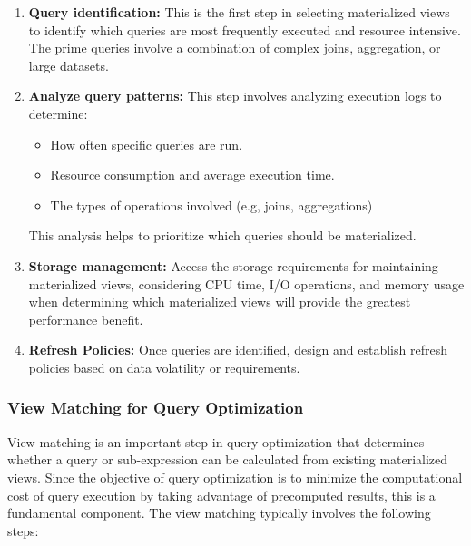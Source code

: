 \begin{enumerate}[label=\alph*)]
    \item \textbf{Query identification:} This is the first step in selecting materialized views to identify which queries are most frequently executed and resource intensive. The prime queries involve a combination of complex joins, aggregation, or large datasets.
    
    \item \textbf{Analyze query patterns:} This step involves analyzing execution logs to determine:
    
     \begin{itemize}
          \item How often specific queries are run.
          \item Resource consumption and average execution time.
          \item The types of operations involved (e.g, joins, aggregations)
      \end{itemize}
      This analysis helps to prioritize which queries should be materialized.
      
    \item \textbf{Storage management:} Access the storage requirements for maintaining materialized views, considering CPU time, I/O operations, and memory usage when determining which materialized views will provide the greatest performance benefit.
    
    \item \textbf{Refresh Policies:} Once queries are identified, design and establish refresh policies based on data volatility or requirements.
\end{enumerate}
\subsubsection{View Matching for Query Optimization }

View matching is an important step in query optimization that determines whether a query or sub-expression can be calculated from existing materialized views. Since the objective of query optimization is to minimize the computational cost of query execution by taking advantage of precomputed results, this is a fundamental component. The view matching typically involves the following steps:\vspace{.4cm}

